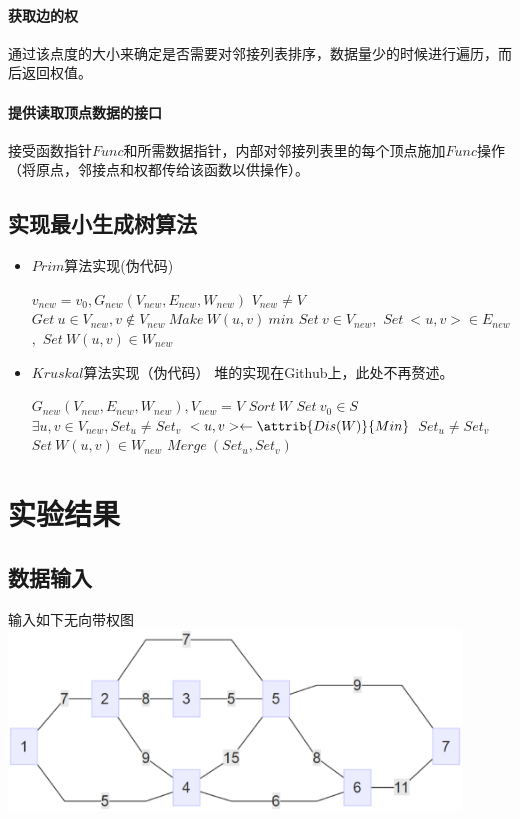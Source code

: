 \documentclass[a4paper,10pt]{ctexart}
\begin{document}
\paragraph{获取边的权}通过该点度的大小来确定是否需要对邻接列表排序，数据量少的时候进行遍历，而后返回权值。
\paragraph{提供读取顶点数据的接口}接受函数指针$Func$和所需数据指针，内部对邻接列表里的每个顶点施加$Func$操作（将原点，邻接点和权都传给该函数以供操作）。

\subsection{实现最小生成树算法}
\begin{itemize}
\item $Prim$算法实现(伪代码)
\begin{codebox}
\li $v_{new} = v_0,G_{new}(V_{new},E_{new},W_{new})$
\li \While $V_{new} \ne V$
    \Do
\li     $Get\ u\in V_{new},v\not\in V_{new}\ Make\ W(u,v)\ min$
\li     $Set\ v \in V_{new}$,\ $Set\ <u,v>\in E_{new}$,\ $Set\ W(u,v)\in W_{new}$
    \End
\end{codebox}
\item $Kruskal$算法实现（伪代码）
堆的实现在Github上，此处不再赘述。
\begin{codebox}
\li $G_{new}(V_{new},E_{new},W_{new}),V_{new}=V$
\li $Sort\ W$
\li $Set \  v_0 \in S$
\li \While $\exists u,v \in V_{new},Set_u \not= Set_v$
    \Do
\li     $<u,v> \gets \attrib{Dis(W)}{Min}$
\li     \If $Set_u \not= Set_v$
        \Do
\li        $Set \ W(u,v) \in W_{new}$
\li        $Merge\ (Set_u,Set_v)$
        \End
    \End
\end{codebox}
\end{itemize}

\section{实验结果}
\subsection{数据输入}
输入如下无向带权图\\
\includegraphics[width=0.9\textwidth]{../Pics/Test-MiniTree.eps}
\end{document}
